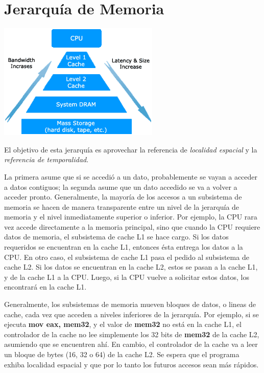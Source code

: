 \section{Jerarqu\'ia de Memoria}
\begin{center}
\includegraphics[scale=0.8]{./Graficos/jerarquia_memoria.png}
\end{center}

\vspace*{1\baselineskip}

El objetivo de esta jerarqu\'ia es aprovechar la referencia de \textit{localidad espacial} y la \textit{referencia de temporalidad}.

La primera  asume que si se accedi\'o a un dato, probablemente se vayan a acceder a datos contiguos; la segunda asume que un dato accedido
se va a volver a acceder pronto. Generalmente, la mayor\'ia de los accesos a un subsistema de memoria se hacen de manera transparente
entre un nivel de la jerarqu\'ia de memoria y el nivel inmediatamente superior o inferior. Por ejemplo, la CPU rara vez accede directamente
a la memoria principal, sino que cuando la CPU requiere datos de memoria, el subsistema de cache L1 se hace cargo. Si los datos requeridos
se encuentran en la cache L1, entonces \'esta entrega los datos a la CPU. En otro caso, el subsistema de cache L1 pasa el pedido al subsistema
de cache L2. Si los datos se encuentran en la cache L2, estos se pasan a la cache L1, y de la cache L1 a la CPU. Luego, si la CPU vuelve a solicitar
estos datos, los encontrar\'a en la cache L1.

Generalmente, los subsistemas de memoria mueven bloques de datos, o lineas de cache, cada vez que acceden a niveles inferiores de la jerarqu\'ia. Por 
ejemplo, si se ejecuta \textbf{mov eax, mem32}, y el valor de \textbf{mem32} no est\'a en la cache L1, el controlador de la cache no lee simplemente
los 32 bits de \textbf{mem32} de la cache L2, asumiendo que se encuentren ah\'i. En cambio, el controlador de la cache va a leer un bloque de bytes
 (16, 32 o 64) de la cache L2. Se espera que el programa exhiba localidad espacial y que por lo tanto los futuros accesos sean m\'as r\'apidos.
 

